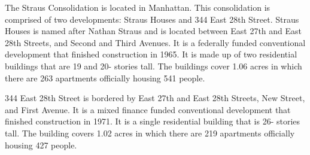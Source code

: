       

    

The Straus Consolidation is located in Manhattan. This consolidation is comprised of two developments: Straus Houses and 344 East 28th Street. Straus Houses is named after Nathan Straus and is located between East 27th and East 28th Streets, and Second and Third Avenues. It is a federally funded conventional development that finished construction in 1965. It is made up of two residential buildings that are 19 and 20- stories tall. The buildings cover 1.06 acres in which there are 263 apartments officially housing 541 people.  

344 East 28th Street is bordered by East 27th and East 28th Streets, New Street, and First Avenue. It is a mixed finance funded conventional development that finished construction in 1971. It is a single residential building that is 26- stories tall. The building covers 1.02 acres in which there are 219 apartments officially housing 427 people.  